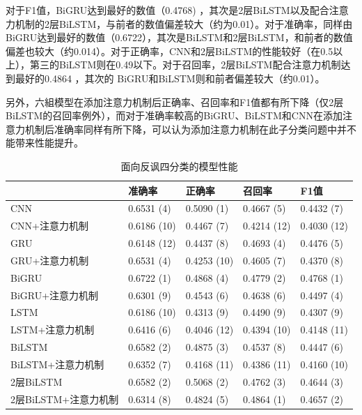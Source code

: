 对于F1值，BiGRU达到最好的数值（0.4768) ，其次是2层BiLSTM以及配合注意力机制的2层BiLSTM，与前者的数值偏差较大（约为0.01）。对于准确率，同样由BiGRU达到最好的数值（0.6722），其次是BiLSTM和2层BiLSTM，和前者的数值偏差也较大（约0.014）。对于正确率，CNN和2层BiLSTM的性能较好（在0.5以上），第三的BiLSTM则在0.49以下。对于召回率，2层BiLSTM配合注意力机制达到最好的0.4864 ，其次的 BiGRU和BiLSTM则和前者偏差较大（约0.01）。

另外，六組模型在添加注意力机制后正确率、召回率和F1值都有所下降（仅2层BiLSTM的召回率例外），而对于准确率較高的BiGRU、BiLSTM和CNN在添加注意力机制后准确率同样有所下降，可以认为添加注意力机制在此子分类问题中并不能带来性能提升。

\begin{table}[htb]
  \centering
  \begin{minipage}[t]{\linewidth}
  \caption{面向反讽四分类的模型性能}
  \label{tab:exp_irony_det_B_result}
    \begin{tabularx}{\linewidth}{X|llll}
    \toprule[1.5pt]
    & 准确率 & 正确率 & 召回率 & F1值 \\
    \hline
    CNN & 0.6531 (4) & 0.5090 (1) & 0.4667 (5) & 0.4432 (7) \\ %
    CNN+注意力机制 & 0.6186 (10) & 0.4467 (7) & 0.4214 (12) & 0.4030 (12) \\ %
    \hline
    GRU & 0.6148 (12) & 0.4437 (8) & 0.4693 (4) & 0.4476 (5) \\ %
    GRU+注意力机制 & 0.6531 (4) & 0.4253 (10) & 0.4605 (7) & 0.4370 (8) \\ %
    \hline
    BiGRU & 0.6722 (1) & 0.4868 (4) & 0.4779 (2) & 0.4768 (1) \\ %
    BiGRU+注意力机制 & 0.6301 (9) & 0.4543 (6) & 0.4638 (6) & 0.4497 (4) \\ %
    \hline
    LSTM & 0.6186 (10) & 0.4313 (9) & 0.4490 (9) & 0.4307 (9) \\ %
    LSTM+注意力机制 & 0.6416 (6) & 0.4046 (12) & 0.4394 (10) & 0.4148 (11) \\ %
    \hline
    BiLSTM & 0.6582 (2) & 0.4875 (3) & 0.4537 (8) & 0.4447 (6) \\ %
    BiLSTM+注意力机制 & 0.6352 (7) & 0.4168 (11) & 0.4386 (11) & 0.4160 (10) \\ %
    \hline
    2层BiLSTM & 0.6582 (2) & 0.5068 (2) & 0.4762 (3) & 0.4644 (3) \\ %
    2层BiLSTM+注意力机制 & 0.6314 (8) & 0.4824 (5) & 0.4864 (1) & 0.4657 (2) \\ %
    \bottomrule[1.5pt]
    \end{tabularx}
  \end{minipage}
\end{table}

